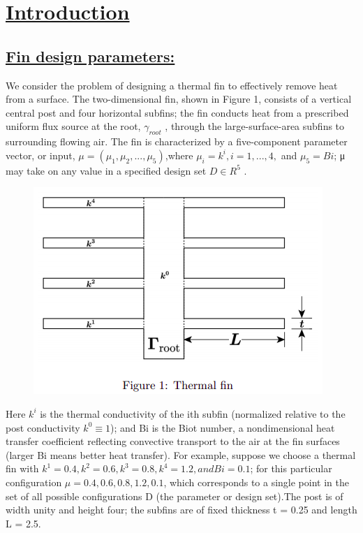 \chapter[Introduction]{\uline{Introduction}}
\section[Fin design parameters]{\uline{Fin design parameters:}}

\hspace{0.2 cm} We consider the problem of designing a thermal fin to effectively remove heat from a surface. The two-dimensional fin, shown in Figure 1, consists of a vertical central post and four horizontal subfins; the fin conducts heat from a prescribed uniform flux source at the root, $\gamma_{root}$ , through the large-surface-area subfins to surrounding flowing air. The fin is characterized by a five-component parameter vector, or input, $\mu = (\mu_1 , \mu_2 , . . . , \mu_5 )$,where $\mu_i = k^i , i = 1, . . . , 4,$ and
$\mu_5 = Bi$; μ may take on any value in a specified design set $D \in R^5$ .

\begin{figure}[h!]
	\centering \includegraphics[scale=0.5]{Images_Fichiers/fin.png}
\end{figure}

Here $k^i$ is the thermal conductivity of the ith subfin (normalized relative to the post conductivity $k^0 ≡ 1$); and Bi is the Biot number, a nondimensional heat transfer coefficient reflecting convective transport to the air at the fin surfaces (larger Bi means better heat transfer). For example, suppose we choose a thermal fin with $k^1 = 0.4, k^2 = 0.6, k^3 = 0.8, k^4 = 1.2, and Bi = 0.1$; for this particular configuration $\mu = {0.4, 0.6, 0.8, 1.2, 0.1}$, which corresponds to a single point in the set of all possible configurations D (the parameter or design set).The post is of width unity and height four; the subfins are of fixed thickness t = 0.25 and length L = 2.5.


